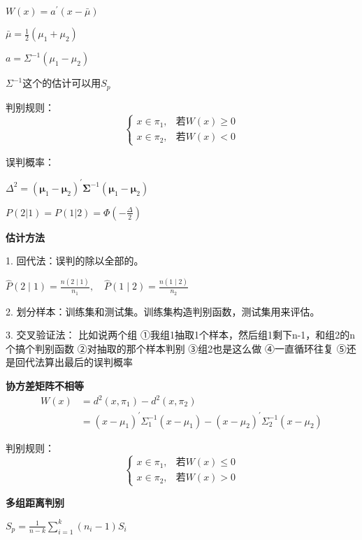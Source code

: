 \documentclass[10pt,a4paper]{ctexart} %
\begin{document}
\begin{multicols*}{3}
		$W(x)=a^{\prime}(x-\bar{\mu})$
		
		$\bar{\mu}=\frac{1}{2}(\mu_1+\mu_2)$
		
		$a=\Sigma^{-1}(\mu_1-\mu_2)$
		
		$\Sigma^{-1}$这个的估计可以用$S_p$
		
		判别规则：
		\begin{equation}
			\begin{cases}
				x{\in}\pi_1,&\text{若}W(x){\geqslant}0\\
				x{\in}\pi_2,&\text{若}W(x){<}0
			\end{cases}
		\end{equation}
		
		误判概率：
		
		$\Delta^2=(\boldsymbol{\mu}_1-\boldsymbol{\mu}_2)^{\prime}\boldsymbol{\Sigma}^{-1}(\boldsymbol{\mu}_1-\boldsymbol{\mu}_2)$
		
		$P\left(2|1\right)=P\left(1|2\right)=\Phi\left(-\frac{\Delta}{2}\right)$
		
		\textbf{估计方法}
		
		1. 回代法：误判的除以全部的。
		
		$\hat{P}(2\mid1)=\frac{n(2\mid1)}{n_1},\quad\hat{P}(1\mid2)=\frac{n(1\mid2)}{n_2}$
		
		2. 划分样本：训练集和测试集。训练集构造判别函数，测试集用来评估。
		
		3. 交叉验证法：   比如说两个组
		①我组1抽取1个样本，然后组1剩下n-1，和组2的n个搞个判别函数
		②对抽取的那个样本判别
		③组2也是这么做
		④一直循环往复
		⑤还是回代法算出最后的误判概率
		
		\textbf{协方差矩阵不相等}
		$$\begin{aligned}W\left(x\right)&=d^{2}\left(x,\pi_{1}\right)-d^{2}\left(x,\pi_{2}\right)\\&=\left(x-\mu_{1}\right)^{\prime}\Sigma_{1}^{-1}\left(x-\mu_{1}\right)-\left(x-\mu_{2}\right)^{\prime}\Sigma_{2}^{-1}\left(x-\mu_{2}\right)\end{aligned}$$
		
		判别规则：
		\begin{equation}
			\begin{cases}
				x{\in}\pi_1,&\text{若}W(x){\leqslant}0\\
				x{\in}\pi_2,&\text{若}W(x){>}0
			\end{cases}
		\end{equation}
		
		\textbf{多组距离判别}
		
		$S_p = \frac{1}{n-k}\sum_{i=1}^k(n_i-1)S_i$
		

\end{multicols*}
\end{document}
